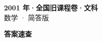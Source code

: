 \documentclass[zihao=-4, a4paper]{ctexart}
\begin{document}
\begin{center}
  {\Large\bfseries 2001 年·全国旧课程卷·文科}\\[4pt]
  {\large 数学 · 简答版}
\end{center}
\medskip
{}

\clearpage
{}
\begin{center}{\Large\bfseries 答案速查}\end{center}
\medskip

\end{document}
